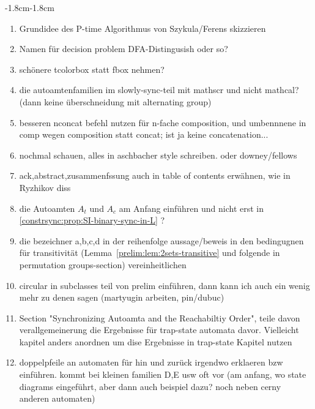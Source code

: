 \begin{adjustwidth}{-1.8cm}{-1.8cm}
\begin{enumerate}[itemsep=-5pt]
	\item Grundidee des P-time Algorithmus von Szykula/Ferens skizzieren
	
	\item Namen für decision problem {\sc DFA-Distingusish} oder so? 
	
	\item schönere tcolorbox statt fbox nehmen?
	
	\item die autoamtenfamilien im slowly-sync-teil mit mathscr und nicht mathcal? (dann keine überschneidung mit alternating group)	
	
	\item  besseren nconcat befehl nutzen für n-fache composition, und umbennnene in comp wegen composition statt concat; ist ja keine concatenation...
		
	\item nochmal schauen, alles in aschbacher style schreiben. oder downey/fellows
		
	\item ack,abstract,zusammenfssung auch in table of contents erwähnen, wie in Ryzhikov diss
	
	\item die Autoamten $A_t$ und $A_c$ am Anfang einführen und nicht erst in \cref{constrsync:prop:SI-binary-sync-in-L} ?
	
	\item die bezeichner a,b,c,d in der reihenfolge aussage/beweis in den bedingugnen für transitivität (Lemma~\ref{prelim:lem:2sets-transitive} und folgende in permutation groups-section) vereinheitlichen	
	
	\item circular in subclasses teil von prelim einführen, dann kann ich auch ein wenig mehr zu denen sagen (martyugin arbeiten, pin/dubuc)	
		
	\item Section "Synchronizing Autoamta and the Reachabiltiy Order", teile davon verallgemeinerung die Ergebnisse für trap-state automata davor. Vielleicht kapitel anders anordnen um dise Ergebnisse in trap-state Kapitel nutzen
		
	\item doppelpfeile an automaten für hin und zurück irgendwo erklaeren bzw einführen. kommt bei kleinen familien D,E usw oft vor (am anfang, wo state diagrams eingeführt, aber dann auch beispiel dazu? noch neben cerny anderen automaten)
	

\end{enumerate}
\end{adjustwidth}

